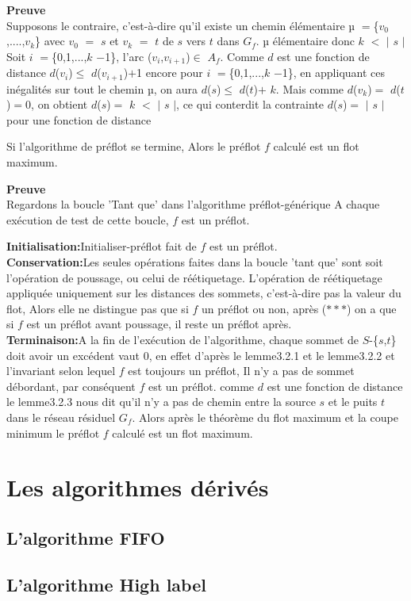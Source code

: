 \textbf{Preuve} \\
Supposons le contraire, c'est-à-dire qu'il existe un chemin élémentaire $µ$ $=$\{$v_0$,....,$v_k$\} avec $v_0$ $=$ $s$ et $v_k$ $=$ $t$ de $s$ vers $t$ dans $G_f$.
$µ$ élémentaire donc $k$ $<$ $|$ $s$ $|$
Soit $i$ $=$\{0,1,...,$k$ $-$1\}, l'arc ($v_i$,$v_{i+1}$)$\in$ $A_f$. Comme $d$ est une fonction de distance $d$($v_i$)$\leq$ $d$($v_{i+1}$)$+$1 encore pour $i$ $=$\{0,1,...,$k$ $-$1\}, en appliquant ces inégalités sur tout le chemin $µ$, on aura
$d$($s$)$\leq$ $d$($t$)$+$ $k$. Mais comme $d$($v_k$)$=$ $d$($t$)$=$0, on obtient 
$d$($s$)$=$ $k$ $<$ $|$ $s$ $|$, ce qui conterdit la contrainte $d$($s$)$=$ $|$ $s$ $|$ pour une fonction de distance \\

\begin{thrm}
Si l'algorithme de préflot se termine, Alors le préflot $f$ calculé est un flot maximum.
\end{thrm}

\textbf{Preuve} \\
 Regardons la boucle 'Tant que' dans l'algorithme préflot-générique A chaque exécution de test de cette boucle, $f$ est un préflot.
 
 \textbf{Initialisation:}Initialiser-préflot fait de $f$ est un préflot.\\ 
 
 \textbf{Conservation:}Les seules opérations faites dans la boucle 'tant que' sont soit l'opération de poussage, ou celui de réétiquetage.  
 L'opération de réétiquetage appliquée uniquement sur les distances des sommets, c'est-à-dire pas la valeur du flot, Alors elle ne distingue pas que si $f$ un préflot ou non, après ($***$) on a que si $f$ est un préflot avant poussage, il reste un préflot après.\\

 
 \textbf{Terminaison:}A la fin de l'exécution de l'algorithme, chaque sommet de
$S$-\{$s$,$t$\} doit avoir un excédent vaut 0, en effet d'après le lemme3.2.1 et le lemme3.2.2 et l'invariant selon lequel $f$ est toujours un préflot, Il n'y a pas de sommet débordant, par conséquent $f$ est un préflot. comme $d$ est une fonction de distance le lemme3.2.3 nous dit qu'il n'y a pas de chemin entre la source $s$ et le puits $t$ dans le réseau résiduel $G_f$.
 Alors après le théorème du flot maximum et la coupe minimum le préflot $f$ calculé est un flot maximum.  


\section{Les algorithmes dérivés}

\subsection{L'algorithme FIFO}

\subsection{L'algorithme High label}
